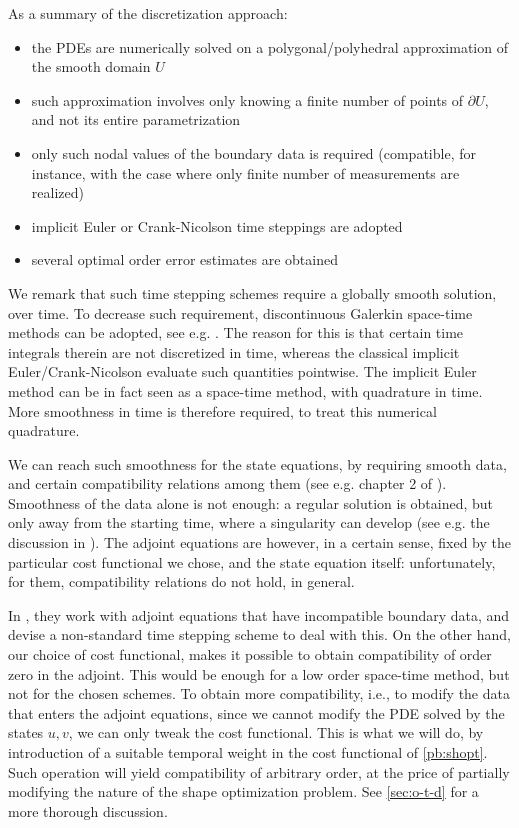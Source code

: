 \documentclass[english,a4paper,9pt,oneside]{scrbook}	%
\theoremstyle{break}
\theoremstyle{remark}
\begin{document}
As a summary of the discretization approach:

\begin{itemize}
	\item the PDEs are numerically solved on a polygonal/polyhedral approximation of the smooth domain $U$
	\item such approximation involves only knowing a finite number of points of $\partial U$, and not its entire parametrization
	\item only such nodal values of the boundary data is required (compatible, for instance, with the case where only finite number of measurements are realized)
	\item implicit Euler or Crank-Nicolson time steppings are adopted
	\item several optimal order error estimates are obtained
\end{itemize}

We remark that such time stepping schemes require a globally smooth solution, over time. To decrease such requirement, discontinuous Galerkin space-time methods can be adopted, see e.g. \cite{vexler}. The reason for this is that certain time integrals therein are not discretized in time, whereas the classical implicit Euler/Crank-Nicolson evaluate such quantities pointwise. The implicit Euler method can be in fact seen as a space-time method, with quadrature in time. More smoothness in time is therefore required, to treat this numerical quadrature.

We can reach such smoothness for the state equations, by requiring smooth data, and certain compatibility relations among them (see e.g. chapter 2 of \cite{lions}). Smoothness of the data alone is not enough: a regular solution is obtained, but only away from the starting time, where a singularity can develop (see e.g. the discussion in \cite{harbrecht}). The adjoint equations are however, in a certain sense, fixed by the particular cost functional we chose, and the state equation itself: unfortunately, for them, compatibility relations do not hold, in general.

In \cite{harbrecht}, they work with adjoint equations that have incompatible boundary data, and devise a non-standard time stepping scheme to deal with this. On the other hand, our choice of cost functional, makes it possible to obtain compatibility of order zero in the adjoint. This would be enough for a low order space-time method, but not for the chosen schemes. To obtain more compatibility, i.e., to modify the data that enters the adjoint equations, since we cannot modify the PDE solved by the states $u,v$, we can only tweak the cost functional. This is what we will do, by introduction of a suitable temporal weight in the cost functional of \cref{pb:shopt}. Such operation will yield compatibility of arbitrary order, at the price of partially modifying the nature of the shape optimization problem. See \cref{sec:o-t-d} for a more thorough discussion.
\end{document}

